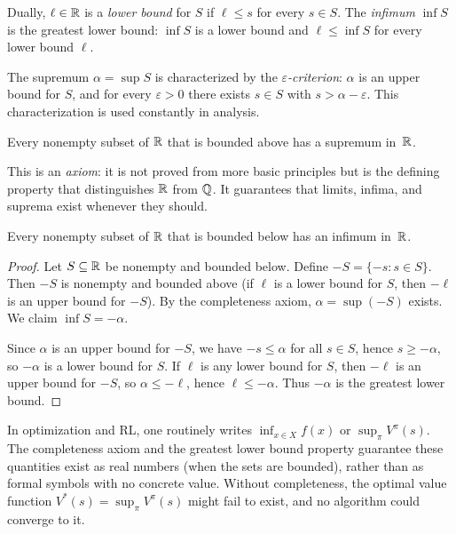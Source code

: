 \documentclass[11pt,a4paper]{article}
\begin{document}
\begin{definition}
\label{def:infimum}
Dually, $\ell \in \mathbb{R}$ is a \emph{lower bound} for $S$ if $\ell \le s$ for
every $s \in S$. The \emph{infimum} $\inf S$ is the greatest lower bound:
$\inf S$ is a lower bound and $\ell \le \inf S$ for every lower bound
$\ell$.
\end{definition}

\begin{remark}
\label{rem:sup_epsilon}
The supremum $\alpha = \sup S$ is characterized by the
\emph{$\varepsilon$-criterion}: $\alpha$ is an upper bound for $S$, and
for every $\varepsilon > 0$ there exists $s \in S$ with
$s > \alpha - \varepsilon$. This characterization is used constantly in
analysis.
\end{remark}

\begin{keyresult}[title={Completeness Axiom}]
\begin{theorem}
\label{thm:completeness}
Every nonempty subset of\/ $\mathbb{R}$ that is bounded above has a supremum
in~$\mathbb{R}$.
\end{theorem}
This is an \emph{axiom}: it is not proved from more basic principles but
is the defining property that distinguishes $\mathbb{R}$ from $\mathbb{Q}$. It
guarantees that limits, infima, and suprema exist whenever they should.
\end{keyresult}

\begin{corollary}
\label{cor:glb}
Every nonempty subset of\/ $\mathbb{R}$ that is bounded below has an infimum
in~$\mathbb{R}$.
\end{corollary}

\begin{proof}
Let $S \subseteq \mathbb{R}$ be nonempty and bounded below. Define
$-S = \{-s : s \in S\}$. Then $-S$ is nonempty and bounded above (if
$\ell$ is a lower bound for $S$, then $-\ell$ is an upper bound for $-S$).
By the completeness axiom, $\alpha = \sup(-S)$ exists. We claim
$\inf S = -\alpha$.

Since $\alpha$ is an upper bound for $-S$, we have $-s \le \alpha$ for
all $s \in S$, hence $s \ge -\alpha$, so $-\alpha$ is a lower bound for
$S$. If $\ell$ is any lower bound for $S$, then $-\ell$ is an upper
bound for $-S$, so $\alpha \le -\ell$, hence $\ell \le -\alpha$. Thus
$-\alpha$ is the greatest lower bound.
\end{proof}

\begin{rlconnection}[title={Suprema and infima in optimization}]
In optimization and RL, one routinely writes $\inf_{x \in X} f(x)$ or
$\sup_\pi V^\pi(s)$. The completeness axiom and the greatest lower bound
property guarantee these quantities exist as real numbers (when the sets
are bounded), rather than as formal symbols with no concrete value.
Without completeness, the optimal value function $V^*(s) = \sup_\pi
V^\pi(s)$ might fail to exist, and no algorithm could converge to it.
\end{rlconnection}
\end{document}
